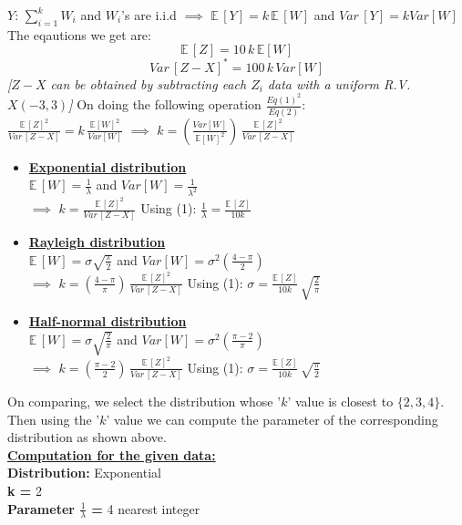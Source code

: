 \documentclass[30pt a4paper]{report}
\begin{document}
	$Y$:$\,\,$$\sum_{i=1}^{k}W_i$ and $W_i$'s are i.i.d $\implies$ $\mathbb{E}\,[Y] = k\,\mathbb{E}\,[W]$ and $Var\,[Y] = kVar[W]$ \\
	The eqautions we get are: \\
	\begin{equation}
		\mathbb{E}\,[Z] = 10\,k\,\mathbb{E}[W]
	\end{equation}
	\begin{equation}
		Var\,[Z-X]^* = 100\,k\,Var[W]
	\end{equation} 
 	\bigskip
	\textit{\small * [$Z-X$ can be obtained by subtracting each $Z_i$ data with a uniform R.V. $X(-3, 3)$]}
	\large \medskip
	 On doing the following operation $\frac{Eq(1)^2}{Eq(2)}$: \\
	 $\frac{\mathbb{E}\,[Z]^2}{Var\,[Z-X]} = k\,\frac{\mathbb{E}[W]^2}{Var[W]}$ $\implies$ $k = \left(\frac{Var[W]}{\mathbb{E}[W]^2} \right)\,\frac{\mathbb{E}\,[Z]^2}{Var\,[Z-X]}$
	\begin{itemize}
		\item \underline{\textbf{Exponential distribution}}\\
			$\mathbb{E}\,[W] = \frac{1}{\lambda}$ and $Var[W] = \frac{1}{\lambda^2}$ \\
			$\implies$ $\boxed{k = \frac{\mathbb{E}\,[Z]^2}{Var\,[Z-X]}}$ 
			Using (1): $\boxed{\frac{1}{\lambda} = \frac{\mathbb{E}\,[Z]}{10k}}$ \\
		\item \underline{\textbf{Rayleigh distribution}} \\
			$\mathbb{E}\,[W] = \sigma \sqrt{\frac{\pi}{2}}$ and $Var[W] = \sigma^2 (\frac{4-\pi}{2})$ \\
			$\implies$ $\boxed{k = \left(\frac{4-\pi}{\pi} \right)\,\frac{\mathbb{E}\,[Z]^2}{Var\,[Z-X]}}$
			Using (1): $\boxed{\sigma = \frac{\mathbb{E}\,[Z]}{10k}\,\sqrt{\frac{2}{\pi}}}$ \medskip
		\item \underline{\textbf{Half-normal distribution}} \\
			$\mathbb{E}\,[W] = \sigma \sqrt{\frac{2}{\pi}}$ and $Var[W] = \sigma^2 (\frac{\pi-2}{\pi})$ \\
			$\implies$ $\boxed{k = \left(\frac{\pi-2}{2} \right)\,\frac{\mathbb{E}\,[Z]^2}{Var\,[Z-X]}}$
			Using (1): $\boxed{\sigma = \frac{\mathbb{E}\,[Z]}{10k}\,\sqrt{\frac{\pi}{2}}}$
	\end{itemize} \bigskip
On comparing, we select the distribution whose '$k$' value is closest to $\{2, 3, 4\}$. Then using the '$k$' value we can compute the parameter of the corresponding distribution as shown above. \\ \medskip
\underline{\textbf{Computation for the given data:}}\\ \medskip
\textbf{Distribution:} Exponential \\ \medskip
\textbf{k = } 2\\ \medskip
\textbf{Parameter $\frac{1}{\lambda}$ = } 4 \small *nearest integer
\end{document}
